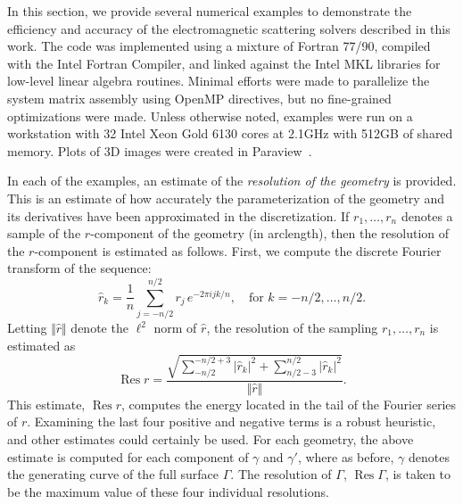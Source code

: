 \documentclass[11pt]{article}
\DeclareMathOperator{\Res}{Res}
\newcommand{\vct}{\vectorsym}
\numberwithin{equation}{section}
\begin{document}
In this section, we provide several numerical examples to demonstrate
the efficiency and accuracy of the electromagnetic scattering solvers
described in this work. The code was implemented using a mixture of Fortran
77/90, compiled with the Intel Fortran Compiler, and linked against
the Intel MKL libraries for low-level linear algebra routines. 
Minimal efforts were
made to parallelize the system matrix assembly using OpenMP
directives, but no fine-grained optimizations were made. Unless
otherwise noted, examples were run on a workstation with 32
Intel Xeon Gold 6130 cores at 2.1GHz with 512GB of shared memory.
Plots of 3D images were created in Paraview~\cite{paraview2005}.


In each of the examples, an estimate of the \emph{resolution of the
geometry} is provided. This is an estimate of how accurately the
parameterization of the geometry and its derivatives have been approximated
in the discretization. If $r_1, \ldots, r_n$ denotes a sample of the
$r$-component of the geometry (in arclength), then the resolution of
the $r$-component is estimated as follows. First, we compute the
discrete Fourier transform of the sequence:
\begin{equation}
  \hat{r}_k = \frac{1}{n} \sum_{j=-n/2}^{n/2} r_j \, e^{-2\pi i j k /n },
  \quad \text{for } k=-n/2, \ldots,n/2.
\end{equation}
Letting $\Vert \hat{r} \Vert$ denote the $\ell^2$ norm of $\hat{r}$,
the resolution of the sampling $r_1, \ldots, r_n$ is estimated as
\begin{equation}
  \Res{r} = \frac{\sqrt{\sum_{-n/2}^{-n/2+3} |\hat{r}_k|^2 +
\sum_{n/2-3}^{n/2} |\hat{r}_k|^2  }}{\Vert \hat{r} \Vert}.
\end{equation}
This estimate, $\Res r$, computes the energy located in the tail of
the Fourier series of $r$. Examining the last four positive and
negative terms is a robust heuristic, and other estimates could certainly be used. 
For each geometry, the above estimate is computed for each component of
$\gamma$ and $\gamma'$, where as before, $\gamma$ denotes the
generating curve of the full surface $\Gamma$. The resolution of
$\Gamma$, $\Res \Gamma$, is taken to be the maximum value of these
four individual resolutions.

%
\end{document}
